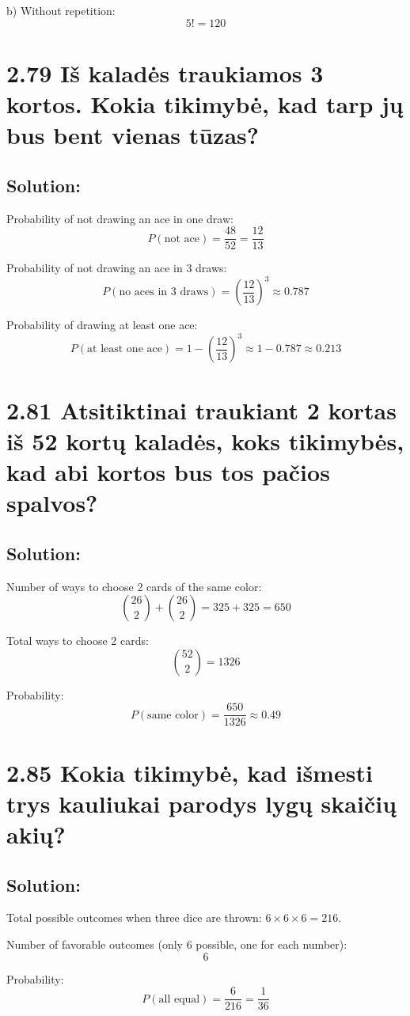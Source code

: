 \documentclass{article}
\begin{document}
{b) Without repetition:
\[
5! = 120
\]

\section*{2.79 Iš kaladės traukiamos 3 kortos. Kokia tikimybė, kad tarp jų bus bent vienas tūzas?}
\subsection*{Solution:}
Probability of not drawing an ace in one draw:
\[
P(\text{not ace}) = \frac{48}{52} = \frac{12}{13}
\]

Probability of not drawing an ace in 3 draws:
\[
P(\text{no aces in 3 draws}) = \left(\frac{12}{13}\right)^3 \approx 0.787
\]

Probability of drawing at least one ace:
\[
P(\text{at least one ace}) = 1 - \left(\frac{12}{13}\right)^3 \approx 1 - 0.787 \approx 0.213
\]

\section*{2.81 Atsitiktinai traukiant 2 kortas iš 52 kortų kaladės, koks tikimybės, kad abi kortos bus tos pačios spalvos?}
\subsection*{Solution:}
Number of ways to choose 2 cards of the same color:
\[
\binom{26}{2} + \binom{26}{2} = 325 + 325 = 650
\]

Total ways to choose 2 cards:
\[
\binom{52}{2} = 1326
\]

Probability:
\[
P(\text{same color}) = \frac{650}{1326} \approx 0.49
\]

\section*{2.85 Kokia tikimybė, kad išmesti trys kauliukai parodys lygų skaičių akių?}
\subsection*{Solution:}
Total possible outcomes when three dice are thrown: \(6 \times 6 \times 6 = 216\).

Number of favorable outcomes (only 6 possible, one for each number):
\[
6
\]

Probability:
\[
P(\text{all equal}) = \frac{6}{216} = \frac{1}{36}
\]

}
\end{document}
